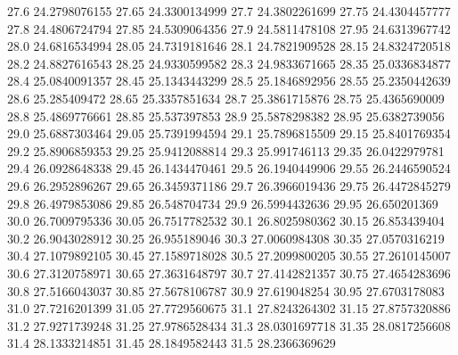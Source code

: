            27.6    24.2798076155
          27.65    24.3300134999
           27.7    24.3802261699
          27.75    24.4304457777
           27.8    24.4806724794
          27.85    24.5309064356
           27.9    24.5811478108
          27.95    24.6313967742
           28.0    24.6816534994
          28.05    24.7319181646
           28.1    24.7821909528
          28.15    24.8324720518
           28.2    24.8827616543
          28.25    24.9330599582
           28.3    24.9833671665
          28.35    25.0336834877
           28.4    25.0840091357
          28.45    25.1343443299
           28.5    25.1846892956
          28.55    25.2350442639
           28.6     25.285409472
          28.65    25.3357851634
           28.7    25.3861715876
          28.75    25.4365690009
           28.8    25.4869776661
          28.85     25.537397853
           28.9    25.5878298382
          28.95    25.6382739056
           29.0    25.6887303464
          29.05    25.7391994594
           29.1    25.7896815509
          29.15    25.8401769354
           29.2    25.8906859353
          29.25    25.9412088814
           29.3     25.991746113
          29.35    26.0422979781
           29.4    26.0928648338
          29.45    26.1434470461
           29.5    26.1940449906
          29.55    26.2446590524
           29.6    26.2952896267
          29.65    26.3459371186
           29.7    26.3966019436
          29.75    26.4472845279
           29.8    26.4979853086
          29.85     26.548704734
           29.9    26.5994432636
          29.95     26.650201369
           30.0    26.7009795336
          30.05    26.7517782532
           30.1    26.8025980362
          30.15     26.853439404
           30.2    26.9043028912
          30.25     26.955189046
           30.3    27.0060984308
          30.35    27.0570316219
           30.4    27.1079892105
          30.45    27.1589718028
           30.5    27.2099800205
          30.55    27.2610145007
           30.6    27.3120758971
          30.65    27.3631648797
           30.7    27.4142821357
          30.75    27.4654283696
           30.8    27.5166043037
          30.85    27.5678106787
           30.9     27.619048254
          30.95    27.6703178083
           31.0    27.7216201399
          31.05    27.7729560675
           31.1    27.8243264302
          31.15    27.8757320886
           31.2    27.9271739248
          31.25    27.9786528434
           31.3    28.0301697718
          31.35    28.0817256608
           31.4    28.1333214851
          31.45    28.1849582443
           31.5    28.2366369629
